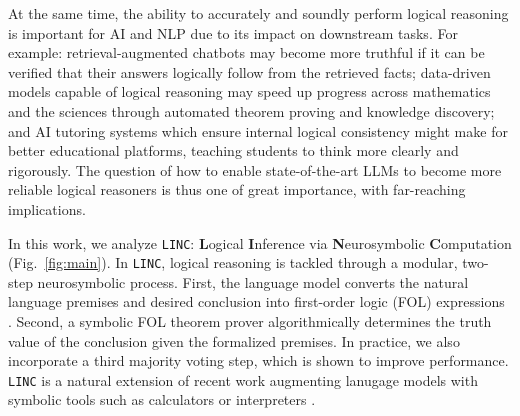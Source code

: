 \documentclass[11pt]{article}
\begin{document}
At the same time, the ability to accurately and soundly perform logical reasoning is important for AI and NLP due to its impact on downstream tasks. 
For example: retrieval-augmented chatbots may become more truthful if it can be verified that their answers logically follow from the retrieved facts;
data-driven models capable of logical reasoning may speed up progress across mathematics and the sciences through automated theorem proving and knowledge discovery;
and AI tutoring systems which ensure internal logical consistency might make for better educational platforms, teaching students to think more clearly and rigorously.
The question of how to enable state-of-the-art LLMs to become more reliable logical reasoners is thus one of great importance, with far-reaching implications.

In this work, we analyze \texttt{LINC}: \textbf{L}ogical \textbf{I}nference via \textbf{N}eurosymbolic \textbf{C}omputation (Fig.~\ref{fig:main}).
In \texttt{LINC}, logical reasoning is tackled through a modular, two-step neurosymbolic process. First, the language model converts the natural language premises and desired conclusion into first-order logic (FOL) expressions \cite{enderton2001mathematical, barker-plummer2011language}. Second, a symbolic FOL theorem prover algorithmically determines the truth value of the conclusion given the formalized premises. In practice, we also incorporate a third majority voting step, which is shown to improve performance.
\texttt{LINC} is a natural extension of recent work augmenting lanugage models with symbolic tools such as calculators or interpreters \citep{schick2023toolformer}.
\end{document}
